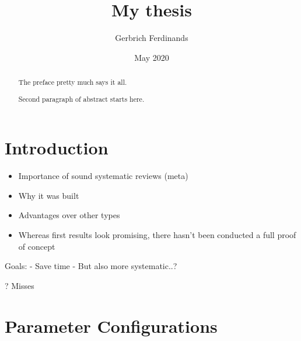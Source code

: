 \documentclass[12pt,twoside]{reedthesis}
\title{My thesis}
\author{Gerbrich Ferdinands}
\date{May 2020}
\begin{document}
  \maketitle

\frontmatter %
\pagestyle{empty} %



  \hypersetup{linkcolor=black}
  \setcounter{tocdepth}{2}
  \tableofcontents

  \listoftables

  \listoffigures
  \begin{abstract}
    The preface pretty much says it all.

    \par

    Second paragraph of abstract starts here.
  \end{abstract}

\mainmatter %
\pagestyle{fancyplain} %

\hypertarget{introduction}{%
\chapter*{Introduction}\label{introduction}}
\begin{itemize}
\item
  Importance of sound systematic reviews (meta)
\item
  Why it was built
\item
  Advantages over other types
\item
  Whereas first results look promising, there hasn't been conducted a full proof of concept
\end{itemize}
Goals:
- Save time
- But also more systematic..?

? Misses

\appendix

\hypertarget{parameter-configurations}{%
\chapter{Parameter Configurations}\label{parameter-configurations}}
\end{document}
